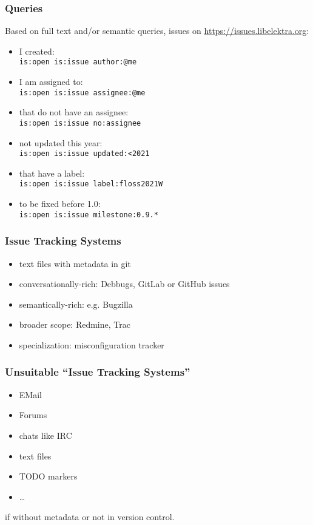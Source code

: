 \begin{frame}[fragile]
	\frametitle{Queries}
	Based on full text and/or semantic queries, issues on \url{https://issues.libelektra.org}:

	\begin{itemize}
		\item I created: \\
			\verb+is:open is:issue author:@me+
		\item I am assigned to: \\
			\verb+is:open is:issue assignee:@me+
		\item that do not have an assignee: \\
			\verb+is:open is:issue no:assignee+
		\item not updated this year: \\
			\verb+is:open is:issue updated:<2021+
		\item that have a label: \\
			\verb+is:open is:issue label:floss2021W+
		\item to be fixed before 1.0: \\
			\verb+is:open is:issue milestone:0.9.*+
	\end{itemize}
\end{frame}

\begin{frame}
	\frametitle{Issue Tracking Systems}

	\begin{itemize}
		\item text files with metadata in git
		\item conversationally-rich: Debbugs, GitLab or GitHub issues
		\item semantically-rich: e.g. Bugzilla
		\item broader scope: Redmine, Trac
		\item specialization: misconfiguration tracker
	\end{itemize}
\end{frame}

\begin{frame}
	\frametitle{Unsuitable ``Issue Tracking Systems''}

	\begin{itemize}
		\item EMail
		\item Forums
		\item chats like IRC
		\item text files
		\item TODO markers
		\item \dots
	\end{itemize}

	if without metadata or not in version control.
\end{frame}

